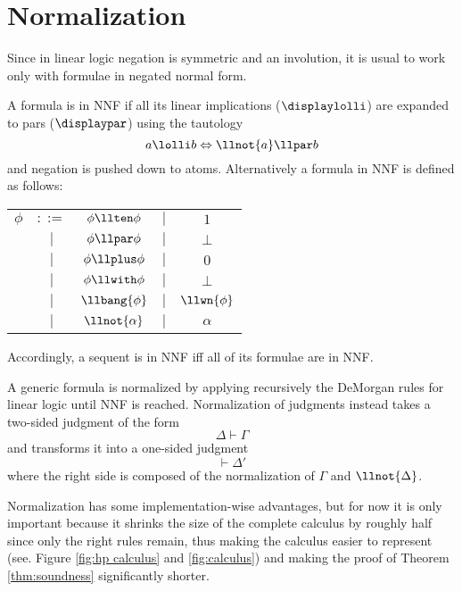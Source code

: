 \section{Normalization}\label{sec:normalization}
Since in linear logic negation is symmetric and an involution, it is usual to work only with formulae in negated normal form.
\begin{define}
	\label{def:nnf}
	A formula is in NNF if all its linear implications ($\displaylolli$) are expanded to pars ($\displaypar$) using the tautology
	$$ a \lolli b \Leftrightarrow \llnot{a} \llpar b $$
	and negation is pushed down to atoms.
	Alternatively a formula in NNF is defined as follows:
	\begin{center}
		\begin{tabular}{ccccc}
			$\phi$ & $ ::=  $  & $ \phi \llten \phi  $ & $ \mid $ & $ 1    $ \\
			       & $ \mid $  & $ \phi \llpar \phi  $ & $ \mid $ & $ \bot $ \\
			       & $ \mid $  & $ \phi \llplus \phi $ & $ \mid $ & $ 0    $ \\
			       & $ \mid $  & $ \phi \llwith \phi $ & $ \mid $ & $ \bot $ \\
			       & $ \mid $  & $ \llbang{\phi}     $ & $ \mid $ & $ \llwn{\phi} $ \\
			       & $ \mid $  & $ \llnot{\alpha}    $ & $ \mid $ & $ \alpha $
		\end{tabular}
	\end{center}
	Accordingly, a sequent is in NNF iff all of its formulae are in NNF.
\end{define}
A generic formula is normalized by applying recursively the DeMorgan rules for linear logic until NNF is reached.
Normalization of judgments instead takes a two-sided judgment of the form
$$ \Delta \vdash \Gamma $$
and transforms it into a one-sided judgment
$$ \vdash \Delta' $$
where the right side is composed of the normalization of $\Gamma$ and $\llnot{\Delta}$.

Normalization has some implementation-wise advantages, but for now it is only important because it shrinks the size of the complete calculus by roughly half since only the right rules remain, thus making the calculus easier to represent (see. Figure \ref{fig:hp calculus} and \ref{fig:calculus}) and making the proof of Theorem \ref{thm:soundness} significantly shorter.

